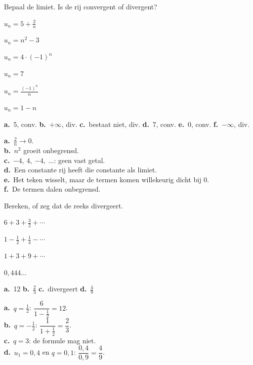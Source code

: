 \begin{oefeningen}
\begin{oefening}[1]\label{oef:h4-soort}
Bepaal de limiet. Is de rij convergent of divergent?
\begin{reeks}
  \item $u_n = 5 + \tfrac2n$
  \item $u_n = n^2 - 3$
  \item $u_n = 4 \cdot (-1)^n$
  \item $u_n = 7$
  \item $u_n = \tfrac{(-1)^n}{n}$
  \item $u_n = 1 - n$
\end{reeks}
\begin{solution}
\textbf{a.}~5, conv. \quad \textbf{b.}~$+\infty$, div. \quad \textbf{c.}~bestaat niet, div. \quad \textbf{d.}~7, conv. \quad \textbf{e.}~0, conv. \quad \textbf{f.}~$-\infty$, div.
\end{solution}
\begin{fullsolution}
\textbf{a.}~$\tfrac2n\to 0$.\\
\textbf{b.}~$n^2$ groeit onbegrensd.\\
\textbf{c.}~$-4,\ 4,\ {-4},\ \ldots$: geen vast getal.\\
\textbf{d.}~Een constante rij heeft die constante als limiet.\\
\textbf{e.}~Het teken wisselt, maar de termen komen willekeurig dicht bij 0.\\
\textbf{f.}~De termen dalen onbegrensd.
\end{fullsolution}
\end{oefening}

\begin{oefening}[1]\label{oef:h4-reeks}
Bereken, of zeg dat de reeks divergeert.
\begin{reeks}[2]
  \item $6 + 3 + \tfrac32 + \cdots$
  \item $1 - \tfrac12 + \tfrac14 - \cdots$
  \item $1 + 3 + 9 + \cdots$
  \item $0{,}444\ldots$
\end{reeks}
\begin{solution}
\textbf{a.}~12 \quad \textbf{b.}~$\tfrac23$ \quad \textbf{c.}~divergeert \quad \textbf{d.}~$\tfrac49$
\end{solution}
\begin{fullsolution}
\textbf{a.}~$q=\tfrac12$: $\dfrac{6}{1-\tfrac12}=12$.\\
\textbf{b.}~$q=-\tfrac12$: $\dfrac{1}{1+\tfrac12}=\dfrac23$.\\
\textbf{c.}~$q=3$: de formule mag niet.\\
\textbf{d.}~$u_1=0{,}4$ en $q=0{,}1$: $\dfrac{0{,}4}{0{,}9}=\dfrac49$.
\end{fullsolution}
\end{oefening}


\end{oefeningen}
